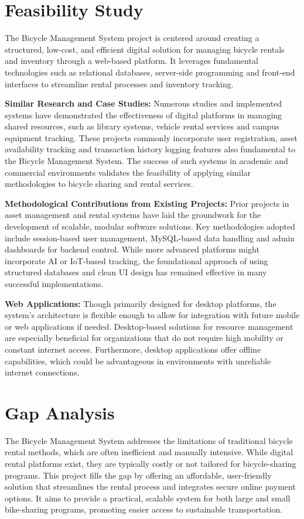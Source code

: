 \section{Feasibility Study}
The Bicycle Management System project is centered around creating a structured, low-cost, and efficient digital solution for managing bicycle rentals and inventory through a web-based platform. It leverages fundamental technologies such as relational databases, server-side programming and front-end interfaces to streamline rental processes and inventory tracking. \\
\item \textbf{Similar Research and Case Studies:}
Numerous studies and implemented systems have demonstrated the effectiveness of digital platforms in managing shared resources, such as library systems, vehicle rental services and campus equipment tracking. These projects commonly incorporate user registration, asset availability tracking and transaction history logging features also fundamental to the Bicycle Management System. The success of such systems in academic and commercial environments validates the feasibility of applying similar methodologies to bicycle sharing and rental services.
\item \textbf{Methodological Contributions from Existing Projects:}
Prior projects in asset management and rental systems have laid the groundwork for the development of scalable, modular software solutions. Key methodologies adopted include session-based user management, MySQL-based data handling and admin dashboards for backend control. While more advanced platforms might incorporate AI or IoT-based tracking, the foundational approach of using structured databases and clean UI design has remained effective in many successful implementations.
\item \textbf{Web Applications:}
Though primarily designed for desktop platforms, the system’s architecture is flexible enough to allow for integration with future mobile or web applications if needed. Desktop-based solutions for resource management are especially beneficial for organizations that do not require high mobility or constant internet access. Furthermore, desktop applications offer offline capabilities, which could be advantageous in environments with unreliable internet connections.\cite{1.4}

\section{Gap Analysis}
The Bicycle Management System addresses the limitations of traditional bicycle rental methods, which are often inefficient and manually intensive. While digital rental platforms exist, they are typically costly or not tailored for bicycle-sharing programs. This project fills the gap by offering an affordable, user-friendly solution that streamlines the rental process and integrates secure online payment options. It aims to provide a practical, scalable system for both large and small bike-sharing programs, promoting easier access to sustainable transportation.\cite{1.5}


